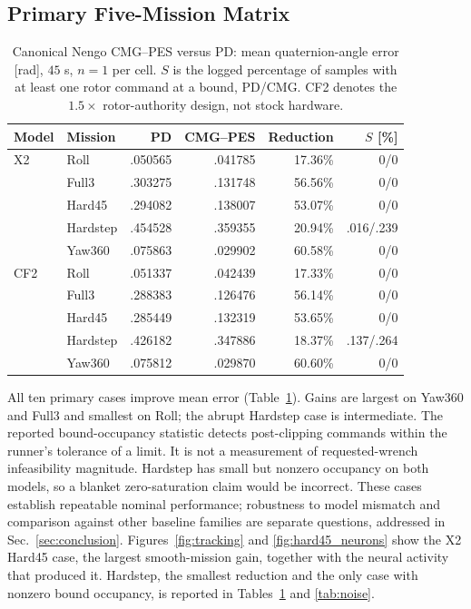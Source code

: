\documentclass[letterpaper,10pt,conference]{IEEEtran}
\begin{document}
\subsection{Primary Five-Mission Matrix}
\begin{table}[t]
\caption{Canonical Nengo CMG--PES versus PD: mean quaternion-angle error
[rad], $45$ s, $n=1$ per cell. $S$ is the logged percentage of samples with
at least one rotor command at a bound, PD/CMG. CF2 denotes the $1.5\times$
rotor-authority design, not stock hardware.}
\label{tab:mujoco}\centering\scriptsize
\setlength{\tabcolsep}{3pt}
\begin{tabular}{llrrrr}
\toprule
Model&Mission&PD&CMG--PES&Reduction&$S$ [\%]\\\midrule
X2&Roll&.050565&.041785&17.36\%&0/0\\
&Full3&.303275&.131748&56.56\%&0/0\\
&Hard45&.294082&.138007&53.07\%&0/0\\
&Hardstep&.454528&.359355&20.94\%&.016/.239\\
&Yaw360&.075863&.029902&60.58\%&0/0\\\midrule
CF2&Roll&.051337&.042439&17.33\%&0/0\\
&Full3&.288383&.126476&56.14\%&0/0\\
&Hard45&.285449&.132319&53.65\%&0/0\\
&Hardstep&.426182&.347886&18.37\%&.137/.264\\
&Yaw360&.075812&.029870&60.60\%&0/0\\\bottomrule
\end{tabular}
\end{table}
All ten primary cases improve mean error (Table~\ref{tab:mujoco}). Gains
are largest on Yaw360 and Full3 and smallest on Roll; the abrupt Hardstep
case is intermediate. The reported bound-occupancy statistic detects
post-clipping commands within the runner's tolerance of a limit. It is not
a measurement of requested-wrench infeasibility magnitude. Hardstep has
small but nonzero occupancy on both models, so a blanket zero-saturation
claim would be incorrect. These cases establish repeatable nominal performance; robustness to model
mismatch and comparison against other baseline families are separate
questions, addressed in Sec.~\ref{sec:conclusion}. Figures~\ref{fig:tracking} and \ref{fig:hard45_neurons} show
the X2 Hard45 case, the largest smooth-mission gain, together with the
neural activity that produced it. Hardstep, the smallest reduction and the
only case with nonzero bound occupancy, is reported in
Tables~\ref{tab:mujoco} and \ref{tab:noise}.
\end{document}
